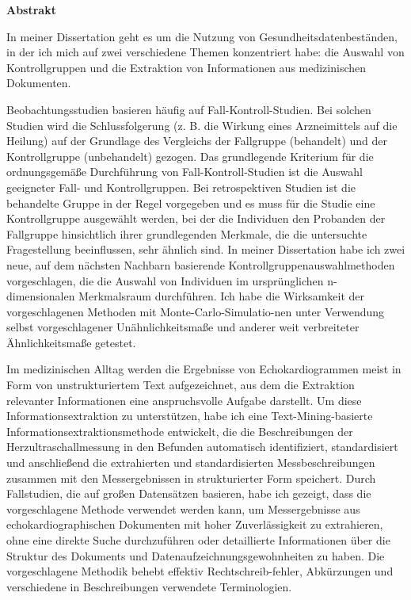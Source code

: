 \centerline{\Large{\textbf{Abstrakt}}}

\vspace{0.5cm}

\noindent In meiner Dissertation geht es um die Nutzung von Gesundheitsdatenbeständen, in der ich mich auf zwei verschiedene Themen konzentriert habe: die Auswahl von Kontrollgruppen und die Extraktion von Informationen aus medizinischen Dokumenten. 

Beobachtungsstudien basieren häufig auf Fall-Kontroll-Studien. Bei solchen Studien wird die Schlussfolgerung (z. B. die Wirkung eines Arzneimittels auf die Heilung) auf der Grundlage des Vergleichs der Fallgruppe (behandelt) und der Kontrollgruppe (unbehandelt) gezogen. Das grundlegende Kriterium für die ordnungsgemäße Durchführung von Fall-Kontroll-Studien ist die Auswahl geeigneter Fall- und Kontrollgruppen. Bei retrospektiven Studien ist die behandelte Gruppe in der Regel vorgegeben und es muss für die Studie eine Kontrollgruppe ausgewählt werden, bei der die Individuen den Probanden der Fallgruppe hinsichtlich ihrer grundlegenden Merkmale, die die untersuchte Fragestellung beeinflussen, sehr ähnlich sind. In meiner Dissertation habe ich zwei neue, auf dem nächsten Nachbarn basierende Kontrollgruppenauswahlmethoden vorgeschlagen, die die Auswahl von Individuen im ursprünglichen n-dimensionalen Merkmalsraum durchführen. Ich habe die Wirksamkeit der vorgeschlagenen Methoden mit Monte-Carlo-Simulatio-nen unter Verwendung selbst vorgeschlagener Unähnlichkeitsmaße und anderer weit verbreiteter Ähnlichkeitsmaße getestet. 

Im medizinischen Alltag werden die Ergebnisse von Echokardiogrammen meist in Form von unstrukturiertem Text aufgezeichnet, aus dem die Extraktion relevanter Informationen eine anspruchsvolle Aufgabe darstellt. Um diese Informationsextraktion zu unterstützen, habe ich eine Text-Mining-basierte Informationsextraktionsmethode entwickelt, die die Beschreibungen der Herzultraschallmessung in den Befunden automatisch identifiziert, standardisiert und anschließend die extrahierten und standardisierten Messbeschreibungen zusammen mit den Messergebnissen in strukturierter Form speichert. Durch Fallstudien, die auf großen Datensätzen basieren, habe ich gezeigt, dass die vorgeschlagene Methode verwendet werden kann, um Messergebnisse aus echokardiographischen Dokumenten mit hoher Zuverlässigkeit zu extrahieren, ohne eine direkte Suche durchzuführen oder detaillierte Informationen über die Struktur des Dokuments und Datenaufzeichnungsgewohnheiten zu haben. Die vorgeschlagene Methodik behebt effektiv Rechtschreib-fehler, Abkürzungen und verschiedene in Beschreibungen verwendete Terminologien.
